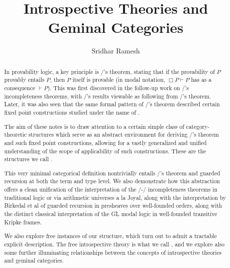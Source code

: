 \documentclass{ucbthesis}
\title{Introspective Theories and Geminal Categories}
\author{Sridhar Ramesh}
\begin{document}
\maketitle

\copyrightpage

\begin{abstract}
In provability logic, a key principle is \Loeb/'s theorem, stating that if the provability of $P$ provably entails $P$, then $P$ itself is provable (in modal notation, $\Box P \vdash P$ has as a consequence $\vdash P$). This was first discovered in the follow-up work on \Goedel/'s incompleteness theorems, with \Goedel/'s results viewable as following from \Loeb/'s theorem. Later, it was also seen that the same formal pattern of \Loeb/'s theorem described certain fixed point constructions studied under the name of .

The aim of these notes is to draw attention to a certain simple class of category-theoretic structures which serve as an abstract environment for deriving \Loeb/'s theorem and such fixed point constructions, allowing for a vastly generalized and unified understanding of the scope of applicability of such constructions. These are the structures we call .

This very minimal categorical definition nontrivially entails \Loeb/'s theorem and guarded recursion at both the term and type level. We also demonstrate how this abstraction offers a clean unification of the interpretation of the \Godel/-\Lob/ incompleteness theorems in traditional logic or via arithmetic universes a la Joyal, along with the interpretation by Birkedal et al of guarded recursion in presheaves over well-founded orders, along with the distinct classical interpretation of the GL modal logic in well-founded transitive Kripke frames.

We also explore free instances of our structure, which turn out to admit a tractable explicit description. The free introspective theory is what we call , and we explore also some further illuminating relationships between the concepts of introspective theories and geminal categories.

\end{abstract}
\end{document}
